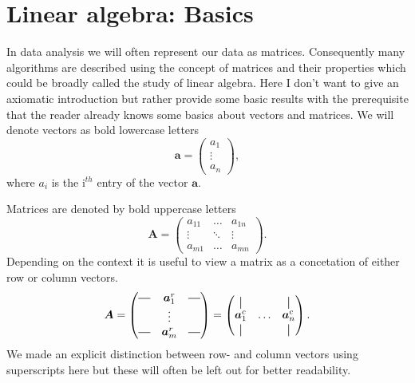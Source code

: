 \section{Linear algebra: Basics}

In data analysis we will often represent our data as matrices. Consequently many algorithms are described using
the concept of matrices and their properties which could be broadly called the study of linear algebra. Here I
don’t want to give an axiomatic introduction but rather provide some basic results with the prerequisite that
the reader already knows some basics about vectors and matrices.
We will denote vectors as bold lowercase letters 
\begin{equation}
\bm{a} = 
\begin{pmatrix}
a_1     \\
\vdots  \\
a_n
\end{pmatrix},
\end{equation}
where $a_i$ is the $\text{i}^{th}$ entry of the vector $\bm{a}$.

Matrices are denoted by bold uppercase letters
\begin{equation}
    \bm{A} = 
    \begin{pmatrix}
        a_{11} & \hdots & a_{1n} \\ 
        \vdots & \ddots & \vdots \\
        a_{m1} & \hdots & a_{mn}
    \end{pmatrix}.
\end{equation}
Depending on the context it is useful to view a matrix as a concetation of either row or column vectors.
\begin{align}
    \bm{A} = \begin{pmatrix}
        \horzbar & \bm{a}_1^r & \horzbar \\
                  & \vdots   &  \\
        \horzbar & \bm{a}_m^r &  \horzbar \\
    \end{pmatrix} = 
    \begin{pmatrix}
    \vertbar &        & \vertbar \\
    \bm{a}_1^c & \hdots & \bm{a}_n^c \\
    \vertbar &        & \vertbar 
    \end{pmatrix}.
\end{align}
We made an explicit distinction between row- and column vectors using superscripts here but these will often be left out
for better readability.

